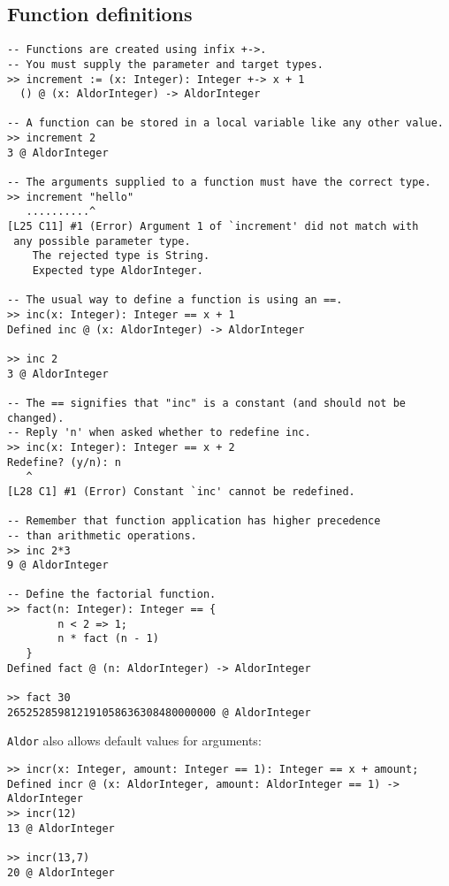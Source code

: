 \documentclass{article}
\newcommand{\Aldor}{{\tt Aldor}}
\begin{document}
\subsection{Function definitions}

\begin{small}
\begin{verbatim}
-- Functions are created using infix +->.
-- You must supply the parameter and target types.
>> increment := (x: Integer): Integer +-> x + 1
  () @ (x: AldorInteger) -> AldorInteger

-- A function can be stored in a local variable like any other value.
>> increment 2
3 @ AldorInteger

-- The arguments supplied to a function must have the correct type.
>> increment "hello"
   ..........^
[L25 C11] #1 (Error) Argument 1 of `increment' did not match with
 any possible parameter type.
    The rejected type is String.
    Expected type AldorInteger.

-- The usual way to define a function is using an ==.
>> inc(x: Integer): Integer == x + 1
Defined inc @ (x: AldorInteger) -> AldorInteger

>> inc 2
3 @ AldorInteger

-- The == signifies that "inc" is a constant (and should not be changed).
-- Reply 'n' when asked whether to redefine inc.
>> inc(x: Integer): Integer == x + 2
Redefine? (y/n): n
   ^
[L28 C1] #1 (Error) Constant `inc' cannot be redefined.

-- Remember that function application has higher precedence
-- than arithmetic operations.
>> inc 2*3
9 @ AldorInteger

-- Define the factorial function.
>> fact(n: Integer): Integer == {
        n < 2 => 1;
        n * fact (n - 1)
   }
Defined fact @ (n: AldorInteger) -> AldorInteger
  
>> fact 30
265252859812191058636308480000000 @ AldorInteger

\end{verbatim}
\end{small}

\Aldor{} also allows default values for arguments:
\begin{small}
\begin{verbatim}
>> incr(x: Integer, amount: Integer == 1): Integer == x + amount;
Defined incr @ (x: AldorInteger, amount: AldorInteger == 1) -> AldorInteger
>> incr(12)
13 @ AldorInteger

>> incr(13,7)
20 @ AldorInteger
\end{verbatim}
\end{small}
\end{document}
